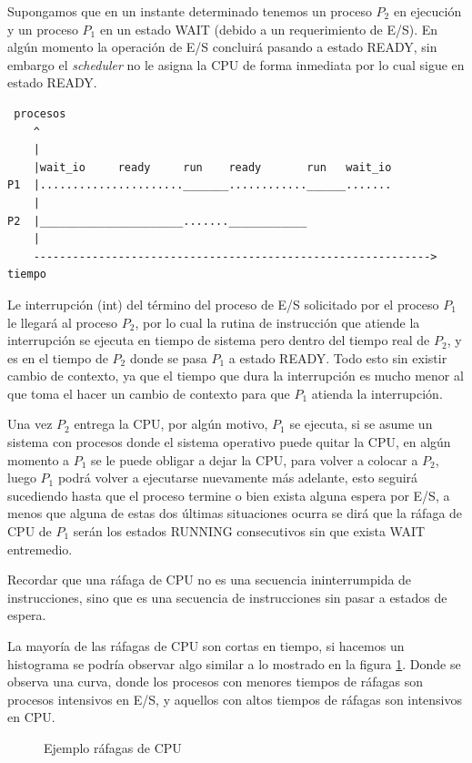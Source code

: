 Supongamos que en un instante determinado tenemos un proceso $P_2$ en ejecución
y un proceso $P_1$ en un estado WAIT (debido a un requerimiento de E/S). En
algún momento la operación de E/S concluirá pasando a estado READY, sin embargo
el \textit{scheduler} no le asigna la CPU de forma inmediata por lo cual sigue
en estado READY.

\begin{verbatim}
 procesos
    ^
    |
    |wait_io     ready     run    ready       run   wait_io
P1  |......................_______............______.......
    |
P2  |______________________.......____________
    |
    -------------------------------------------------------------> tiempo
\end{verbatim}

Le interrupción (int) del término del proceso de E/S solicitado por el proceso
$P_1$ le llegará al proceso $P_2$, por lo cual la rutina de instrucción que
atiende la interrupción se ejecuta en tiempo de sistema pero dentro del tiempo
real de $P_2$, y es en el tiempo de $P_2$ donde se pasa $P_1$ a estado READY.
Todo esto sin existir cambio de contexto, ya que el tiempo que dura la
interrupción es mucho menor al que toma el hacer un cambio de contexto para que
$P_1$ atienda la interrupción.

Una vez $P_2$ entrega la CPU, por algún motivo, $P_1$ se ejecuta, si se asume un
sistema con procesos donde el sistema operativo puede quitar la CPU, en algún
momento a $P_1$ se le puede obligar a dejar la CPU, para volver a colocar a
$P_2$, luego $P_1$ podrá volver a ejecutarse nuevamente más adelante, esto
seguirá sucediendo hasta que el proceso termine o bien exista alguna espera por
E/S, a menos que alguna de estas dos últimas situaciones ocurra se dirá que la
ráfaga de CPU de $P_1$ serán los estados RUNNING consecutivos sin que exista
WAIT entremedio.

Recordar que una ráfaga de CPU no es una secuencia ininterrumpida de
instrucciones, sino que es una secuencia de instrucciones sin pasar a estados de
espera.

La mayoría de las ráfagas de CPU son cortas en tiempo, si hacemos un histograma
se podría observar algo similar a lo mostrado en la figura
\ref{fig:rafagas_cpu}. Donde se observa una curva, donde los procesos con
menores tiempos de ráfagas son procesos intensivos en E/S, y aquellos con altos
tiempos de ráfagas son intensivos en CPU.

\begin{figure}[htbp]
	\centering
	\caption{Ejemplo ráfagas de CPU}
	\label{fig:rafagas_cpu}
\end{figure}

